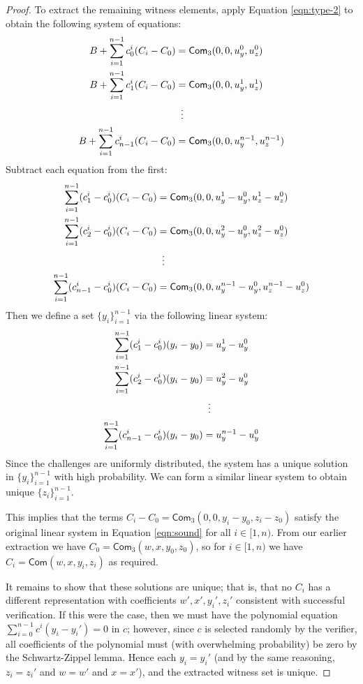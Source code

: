 \documentclass{article}
\newcommand{\func}[1]{\mathsf{#1}}
\newcommand{\com}{\func{Com}}
\begin{document}
\begin{proof}
To extract the remaining witness elements, apply Equation \ref{eqn:type-2} to obtain the following system of equations:
\begin{gather}
\begin{aligned}
    \label{eqn:sound}
    B + \sum_{i=1}^{n-1} c_0^i(C_i - C_0) &= \com_3(0, 0, u_y^0, u_z^0) \\
    B + \sum_{i=1}^{n-1} c_1^i(C_i - C_0) &= \com_3(0, 0, u_y^1, u_z^1) \\
    &\vdotswithin{=} \\
    B + \sum_{i=1}^{n-1} c_{n-1}^i(C_i - C_0) &= \com_3(0, 0, u_y^{n-1}, u_z^{n-1})
\end{aligned}
\end{gather}
Subtract each equation from the first:
\begin{align*}
    \sum_{i=1}^{n-1} (c_1^i - c_0^i)(C_i - C_0) &= \com_3(0, 0, u_y^1 - u_y^0, u_z^1 - u_z^0) \\
    \sum_{i=1}^{n-1} (c_2^i - c_0^i)(C_i - C_0) &= \com_3(0, 0, u_y^2 - u_y^0, u_z^2 - u_z^0) \\
    &\vdotswithin{=} \\
    \sum_{i=1}^{n-1} (c_{n-1}^i - c_0^i)(C_i - C_0) &= \com_3(0, 0, u_y^{n-1} - u_y^0, u_z^{n-1} - u_z^0)
\end{align*}
Then we define a set $\{y_i\}_{i=1}^{n-1}$ via the following linear system:
\begin{align*}
    \sum_{i=1}^{n-1} (c_1^i - c_0^i)(y_i - y_0) &= u_y^1 - u_y^0 \\
    \sum_{i=1}^{n-1} (c_2^i - c_0^i)(y_i - y_0) &= u_y^2 - u_y^0 \\
    &\vdotswithin{=} \\
    \sum_{i=1}^{n-1} (c_{n-1}^i - c_0^i)(y_i - y_0) &= u_y^{n-1} - u_y^0
\end{align*}
Since the challenges are uniformly distributed, the system has a unique solution in $\{y_i\}_{i=1}^{n-1}$ with high probability.
We can form a similar linear system to obtain unique $\{z_i\}_{i=1}^{n-1}$.

This implies that the terms $C_i - C_0 = \com_3(0, 0, y_i - y_0, z_i - z_0)$ satisfy the original linear system in Equation \ref{eqn:sound} for all $i \in [1,n)$.
From our earlier extraction we have $C_0 = \com_3(w, x, y_0, z_0)$, so for $i \in [1,n)$ we have $C_i = \com(w, x, y_i, z_i)$ as required.

It remains to show that these solutions are unique; that is, that no $C_i$ has a different representation with coefficients $w',x',y_i',z_i'$ consistent with successful verification.
If this were the case, then we must have the polynomial equation $\sum_{i=0}^{n-1} c^i(y_i - y_i') = 0$ in $c$; however, since $c$ is selected randomly by the verifier, all coefficients of the polynomial must (with overwhelming probability) be zero by the Schwartz-Zippel lemma.
Hence each $y_i = y_i'$ (and by the same reasoning, $z_i = z_i'$ and $w = w'$ and $x = x'$), and the extracted witness set is unique.


\end{proof}
\end{document}

